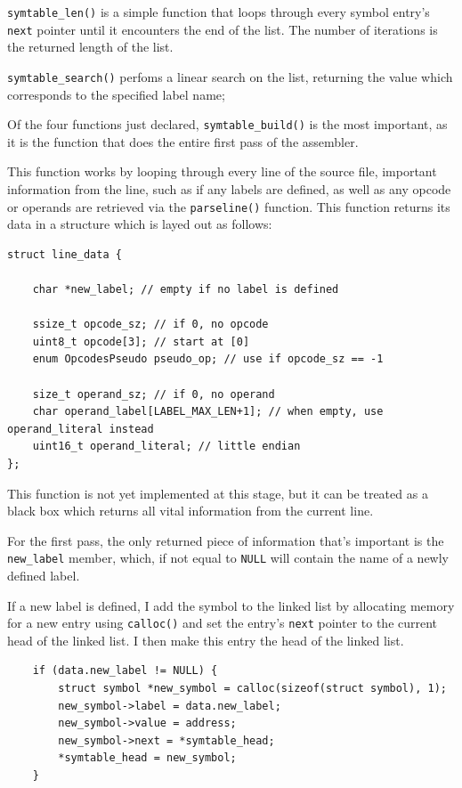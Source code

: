 \documentclass[a4paper]{report}
\begin{document}
\texttt{symtable\_len()} is a simple function that loops through every symbol
entry's \texttt{next} pointer until it encounters the end of the list. The
number of iterations is the returned length of the list.

\texttt{symtable\_search()} perfoms a linear search on the list, returning the
value which corresponds to the specified label name;

\bigbreak

Of the four functions just declared, \texttt{symtable\_build()} is the most
important, as it is the function that does the entire first pass of the
assembler.

This function works by looping through every line of the source file, important
information from the line, such as if any labels are defined, as well as any
opcode or operands are retrieved via the \texttt{parseline()} function. This
function returns its data in a structure which is layed out as follows:

\begin{lstlisting}
struct line_data {
	
	char *new_label; // empty if no label is defined

	ssize_t opcode_sz; // if 0, no opcode
	uint8_t opcode[3]; // start at [0]
	enum OpcodesPseudo pseudo_op; // use if opcode_sz == -1

	size_t operand_sz; // if 0, no operand
	char operand_label[LABEL_MAX_LEN+1]; // when empty, use operand_literal instead
	uint16_t operand_literal; // little endian
};
\end{lstlisting}

This function is not yet implemented at this stage, but it can be treated as a
black box which returns all vital information from the current line.

For the first pass, the only returned piece of information that's important is
the \texttt{new\_label} member, which, if not equal to \texttt{NULL} will
contain the name of a newly defined label.

If a new label is defined, I add the symbol to the linked list by allocating
memory for a new entry using \texttt{calloc()} and set the entry's \texttt{next}
pointer to the current head of the linked list. I then make this entry the
head of the linked list.

\begin{lstlisting}
	if (data.new_label != NULL) {
		struct symbol *new_symbol = calloc(sizeof(struct symbol), 1);
		new_symbol->label = data.new_label;
		new_symbol->value = address;
		new_symbol->next = *symtable_head;
		*symtable_head = new_symbol;
	}
\end{lstlisting}
\end{document}
